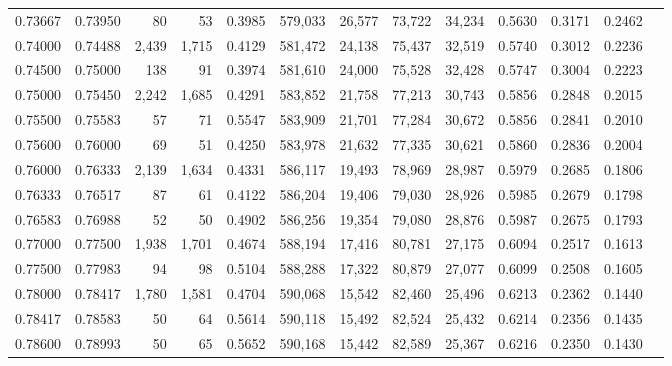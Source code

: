 \begin{tabular}{rrrrrrrrrrrrr}
0.73667 & 0.73950 &     80 &    53 &                                     0.3985 & 579,033 &  26,577 &  73,722 &  34,234 & 0.5630 & 0.3171 & 0.2462 \\
0.74000 & 0.74488 &  2,439 & 1,715 &                                     0.4129 & 581,472 &  24,138 &  75,437 &  32,519 & 0.5740 & 0.3012 & 0.2236 \\
0.74500 & 0.75000 &    138 &    91 &                                     0.3974 & 581,610 &  24,000 &  75,528 &  32,428 & 0.5747 & 0.3004 & 0.2223 \\
0.75000 & 0.75450 &  2,242 & 1,685 &                                     0.4291 & 583,852 &  21,758 &  77,213 &  30,743 & 0.5856 & 0.2848 & 0.2015 \\
0.75500 & 0.75583 &     57 &    71 &                                     0.5547 & 583,909 &  21,701 &  77,284 &  30,672 & 0.5856 & 0.2841 & 0.2010 \\
0.75600 & 0.76000 &     69 &    51 &                                     0.4250 & 583,978 &  21,632 &  77,335 &  30,621 & 0.5860 & 0.2836 & 0.2004 \\
0.76000 & 0.76333 &  2,139 & 1,634 &                                     0.4331 & 586,117 &  19,493 &  78,969 &  28,987 & 0.5979 & 0.2685 & 0.1806 \\
0.76333 & 0.76517 &     87 &    61 &                                     0.4122 & 586,204 &  19,406 &  79,030 &  28,926 & 0.5985 & 0.2679 & 0.1798 \\
0.76583 & 0.76988 &     52 &    50 &                                     0.4902 & 586,256 &  19,354 &  79,080 &  28,876 & 0.5987 & 0.2675 & 0.1793 \\
0.77000 & 0.77500 &  1,938 & 1,701 &                                     0.4674 & 588,194 &  17,416 &  80,781 &  27,175 & 0.6094 & 0.2517 & 0.1613 \\
0.77500 & 0.77983 &     94 &    98 &                                     0.5104 & 588,288 &  17,322 &  80,879 &  27,077 & 0.6099 & 0.2508 & 0.1605 \\
0.78000 & 0.78417 &  1,780 & 1,581 &                                     0.4704 & 590,068 &  15,542 &  82,460 &  25,496 & 0.6213 & 0.2362 & 0.1440 \\
0.78417 & 0.78583 &     50 &    64 &                                     0.5614 & 590,118 &  15,492 &  82,524 &  25,432 & 0.6214 & 0.2356 & 0.1435 \\
0.78600 & 0.78993 &     50 &    65 &                                     0.5652 & 590,168 &  15,442 &  82,589 &  25,367 & 0.6216 & 0.2350 & 0.1430 \\

\end{tabular}
